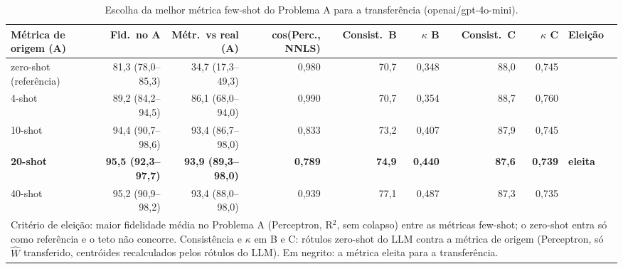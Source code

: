\begin{table}[htbp]
\centering
\small
\caption{Escolha da melhor métrica few-shot do Problema A para a transferência (openai/gpt-4o-mini).}
\label{tab:T7_escolha_gpt4mini}
\begin{tabular}{lrrrrrrrl}
\toprule
Métrica de origem (A) & Fid.\ no A & Métr.\ vs real (A) & cos(Perc., NNLS) & Consist.\ B & $\kappa$ B & Consist.\ C & $\kappa$ C & Eleição \\
\midrule
zero-shot (referência) & 81,3 (78,0–85,3) & 34,7 (17,3–49,3) & 0,980 & 70,7 & 0,348 & 88,0 & 0,745 &  \\
4-shot & 89,2 (84,2–94,5) & 86,1 (68,0–94,0) & 0,990 & 70,7 & 0,354 & 88,7 & 0,760 &  \\
10-shot & 94,4 (90,7–98,6) & 93,4 (86,7–98,0) & 0,833 & 73,2 & 0,407 & 87,9 & 0,745 &  \\
\textbf{20-shot} & \textbf{95,5 (92,3–97,7)} & \textbf{93,9 (89,3–98,0)} & \textbf{0,789} & \textbf{74,9} & \textbf{0,440} & \textbf{87,6} & \textbf{0,739} & \textbf{eleita} \\
40-shot & 95,2 (90,9–98,2) & 93,4 (88,0–98,0) & 0,939 & 77,1 & 0,487 & 87,3 & 0,735 &  \\
\bottomrule
\multicolumn{9}{p{0.95\linewidth}}{\footnotesize Critério de eleição: maior fidelidade média no Problema A (Perceptron, R$^2$, sem colapso) entre as métricas few-shot; o zero-shot entra só como referência e o teto não concorre. Consistência e $\kappa$ em B e C: rótulos zero-shot do LLM contra a métrica de origem (Perceptron, só $\hat{W}$ transferido, centróides recalculados pelos rótulos do LLM). Em negrito: a métrica eleita para a transferência.} \\
\end{tabular}
\end{table}
